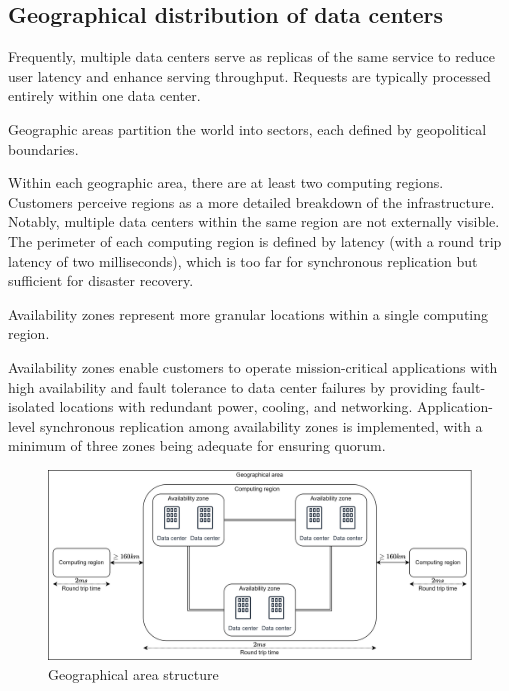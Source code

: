 \subsection{Geographical distribution of data centers}
Frequently, multiple data centers serve as replicas of the same service to reduce user latency and enhance serving throughput. 
Requests are typically processed entirely within one data center.
\begin{definition}
    Geographic areas partition the world into sectors, each defined by geopolitical boundaries.
\end{definition}
Within each geographic area, there are at least two computing regions. 
Customers perceive regions as a more detailed breakdown of the infrastructure. 
Notably, multiple data centers within the same region are not externally visible. 
The perimeter of each computing region is defined by latency (with a round trip latency of two milliseconds), which is too far for synchronous replication but sufficient for disaster recovery.
\begin{definition}
    Availability zones represent more granular locations within a single computing region.
\end{definition}
Availability zones enable customers to operate mission-critical applications with high availability and fault tolerance to data center failures by providing fault-isolated locations with redundant power, cooling, and networking. 
Application-level synchronous replication among availability zones is implemented, with a minimum of three zones being adequate for ensuring quorum.
\begin{figure}[H]
    \centering
    \includegraphics[width=1\linewidth]{images/computing.png}
    \caption{Geographical area structure}
\end{figure}